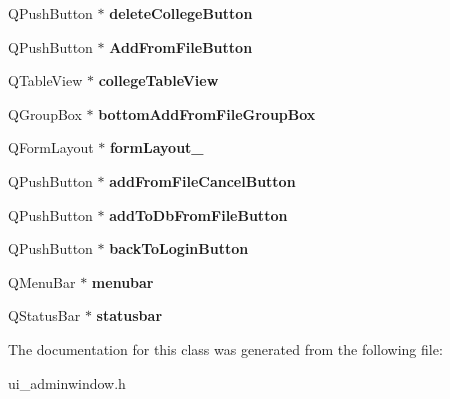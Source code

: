 \begin{DoxyCompactItemize}
Q\+Push\+Button $\ast$ {\bfseries delete\+College\+Button}
\item 
\mbox{\label{class_ui__admin_window_a209626e14e7a010effce5394e16e4b35}} 
Q\+Push\+Button $\ast$ {\bfseries Add\+From\+File\+Button}
\item 
\mbox{\label{class_ui__admin_window_ac94bb54feb39f45c0a35f3c704ea5841}} 
Q\+Table\+View $\ast$ {\bfseries college\+Table\+View}
\item 
\mbox{\label{class_ui__admin_window_a6c8d544913e5e279aafd5a065959a703}} 
Q\+Group\+Box $\ast$ {\bfseries bottom\+Add\+From\+File\+Group\+Box}
\item 
\mbox{\label{class_ui__admin_window_a9edf8d96a5e2d4701a6df533e0d5cc08}} 
Q\+Form\+Layout $\ast$ {\bfseries form\+Layout\+\_}
\item 
\mbox{\label{class_ui__admin_window_a47a7c147a35ebaf48048fa2065db8ae8}} 
Q\+Push\+Button $\ast$ {\bfseries add\+From\+File\+Cancel\+Button}
\item 
\mbox{\label{class_ui__admin_window_afae8499974792fa5d0ff67f98bfe614f}} 
Q\+Push\+Button $\ast$ {\bfseries add\+To\+Db\+From\+File\+Button}
\item 
\mbox{\label{class_ui__admin_window_a6abf93073b198b3c1621fc0bdbf79679}} 
Q\+Push\+Button $\ast$ {\bfseries back\+To\+Login\+Button}
\item 
\mbox{\label{class_ui__admin_window_a98cd502dd8efcf672c2faea2783f3ec4}} 
Q\+Menu\+Bar $\ast$ {\bfseries menubar}
\item 
\mbox{\label{class_ui__admin_window_accb31cc05b2f6f5f6ce1bf13a5a3d210}} 
Q\+Status\+Bar $\ast$ {\bfseries statusbar}
\end{DoxyCompactItemize}


The documentation for this class was generated from the following file\+:\begin{DoxyCompactItemize}
\item 
ui\+\_\+adminwindow.\+h\end{DoxyCompactItemize}
